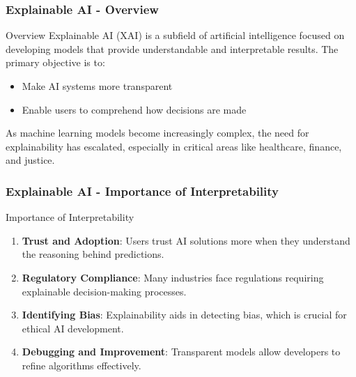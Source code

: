 \documentclass{beamer}
\begin{document}
\begin{frame}[fragile]
    \frametitle{Explainable AI - Overview}
    \begin{block}{Overview}
        Explainable AI (XAI) is a subfield of artificial intelligence focused on developing models that provide understandable and interpretable results. 
        The primary objective is to:
        \begin{itemize}
            \item Make AI systems more transparent
            \item Enable users to comprehend how decisions are made
        \end{itemize}
        As machine learning models become increasingly complex, the need for explainability has escalated, especially in critical areas like healthcare, finance, and justice.
    \end{block}
\end{frame}

\begin{frame}[fragile]
    \frametitle{Explainable AI - Importance of Interpretability}
    \begin{block}{Importance of Interpretability}
        \begin{enumerate}
            \item \textbf{Trust and Adoption}: Users trust AI solutions more when they understand the reasoning behind predictions.
            \item \textbf{Regulatory Compliance}: Many industries face regulations requiring explainable decision-making processes.
            \item \textbf{Identifying Bias}: Explainability aids in detecting bias, which is crucial for ethical AI development.
            \item \textbf{Debugging and Improvement}: Transparent models allow developers to refine algorithms effectively.
        \end{enumerate}
    \end{block}
\end{frame}
\end{document}

